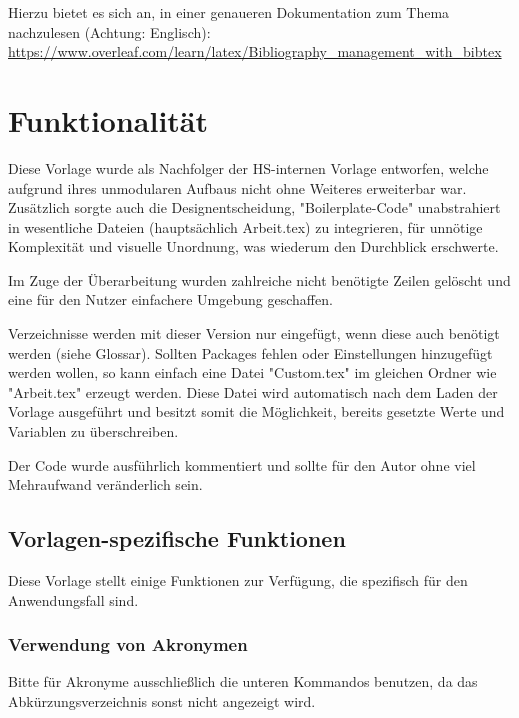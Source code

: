Hierzu bietet es sich an, in einer genaueren Dokumentation zum Thema nachzulesen (Achtung: Englisch):
\url{https://www.overleaf.com/learn/latex/Bibliography_management_with_bibtex}

\section{Funktionalität}

Diese Vorlage wurde als Nachfolger der HS-internen Vorlage entworfen, welche aufgrund ihres
unmodularen Aufbaus nicht ohne Weiteres erweiterbar war. Zusätzlich sorgte auch die
Designentscheidung, "Boilerplate-Code" unabstrahiert in wesentliche Dateien (hauptsächlich Arbeit.tex)
zu integrieren, für unnötige Komplexität und visuelle Unordnung, was wiederum den Durchblick erschwerte.

Im Zuge der Überarbeitung wurden zahlreiche nicht benötigte Zeilen gelöscht und eine für
den Nutzer einfachere Umgebung geschaffen.

Verzeichnisse werden mit dieser Version nur eingefügt, wenn diese auch benötigt werden (siehe
\Gls{Glossar}). Sollten Packages fehlen oder Einstellungen hinzugefügt werden wollen,
so kann einfach eine Datei "Custom.tex" im gleichen Ordner wie "Arbeit.tex" erzeugt werden.
Diese Datei wird automatisch nach dem Laden der Vorlage ausgeführt und besitzt somit die
Möglichkeit, bereits gesetzte Werte und Variablen zu überschreiben.

Der Code wurde ausführlich kommentiert und sollte für den Autor ohne viel Mehraufwand veränderlich sein.

\subsection{Vorlagen-spezifische Funktionen}

Diese Vorlage stellt einige Funktionen zur Verfügung, die spezifisch für den Anwendungsfall sind.


\subsubsection{Verwendung von Akronymen}

Bitte für Akronyme ausschließlich die unteren Kommandos benutzen, da das Abkürzungsverzeichnis
sonst nicht angezeigt wird.

